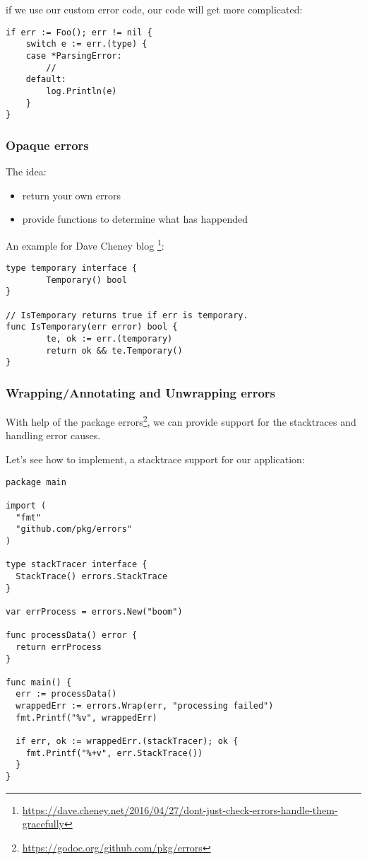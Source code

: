 \documentclass[11pt, letterpaper]{article}
\begin{document}
if we use our custom error code, our code will get more complicated:

\begin{verbatim}
if err := Foo(); err != nil {
    switch e := err.(type) {
    case *ParsingError:
        // 
    default:
        log.Println(e)
    }
}
\end{verbatim}

\bigskip

\subsubsection{Opaque errors}

The idea:

\begin{itemize}
\item return your own errors
\item provide functions to determine what has happended
\end{itemize}

An example for Dave Cheney blog \footnote{\href{https://dave.cheney.net/2016/04/27/dont-just-check-errors-handle-them-gracefully}{https://dave.cheney.net/2016/04/27/dont-just-check-errors-handle-them-gracefully}}:

\begin{verbatim}
type temporary interface {
        Temporary() bool
}
 
// IsTemporary returns true if err is temporary.
func IsTemporary(err error) bool {
        te, ok := err.(temporary)
        return ok && te.Temporary()
}
\end{verbatim}

\subsubsection{Wrapping/Annotating and Unwrapping errors}

With help of the package errors\footnote{\href{https://godoc.org/github.com/pkg/errors}{https://godoc.org/github.com/pkg/errors}}, we can provide support for the stacktraces and handling error causes.

Let's see how to implement, a stacktrace support for our application: 

\begin{verbatim}
package main

import (
  "fmt"
  "github.com/pkg/errors"
)

type stackTracer interface {
  StackTrace() errors.StackTrace
}

var errProcess = errors.New("boom")

func processData() error {
  return errProcess
}

func main() {
  err := processData()
  wrappedErr := errors.Wrap(err, "processing failed")
  fmt.Printf("%v", wrappedErr)

  if err, ok := wrappedErr.(stackTracer); ok {
    fmt.Printf("%+v", err.StackTrace())
  }
}
\end{verbatim}
\end{document}
